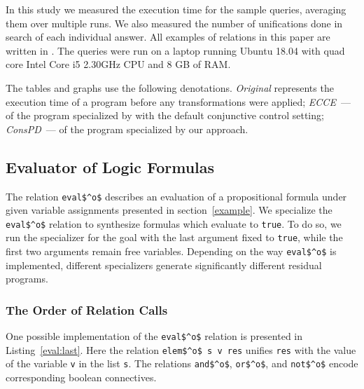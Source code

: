 In this study we measured the execution time for the sample queries, averaging them over multiple runs.
We also measured the number of unifications done in search of each individual answer.
All examples of \mk relations in this paper are written in \oc.
The queries were run on a laptop running Ubuntu 18.04 with quad core Intel Core i5 2.30GHz CPU and 8 GB of RAM.

The tables and graphs use the following denotations.
\emph{Original} represents the execution time of a program before any transformations were applied; \emph{ECCE}~--- of the program specialized by \ecce with the default conjunctive control setting; \emph{ConsPD}~--- of the program specialized by our approach.

\subsection{Evaluator of Logic Formulas}

The relation \lstinline{eval$^o$} describes an evaluation of a propositional formula under given variable assignments presented in section~\ref{example}.
We specialize the \lstinline{eval$^o$} relation to synthesize formulas which evaluate to \lstinline{true}.
To do so, we run the specializer for the goal with the last argument fixed to \lstinline{true}, while the first two arguments remain free variables.
Depending on the way \lstinline{eval$^o$} is implemented, different specializers generate significantly different residual programs.

\subsubsection{The Order of Relation Calls}

One possible implementation of the \lstinline{eval$^o$} relation is presented in Listing~\ref{eval:last}.
Here the relation \lstinline{elem$^o$ s v res} unifies \lstinline{res} with the value of the variable \lstinline{v} in the list \lstinline{s}.
The relations \lstinline{and$^o$}, \lstinline{or$^o$}, and \lstinline{not$^o$} encode corresponding boolean connectives.

